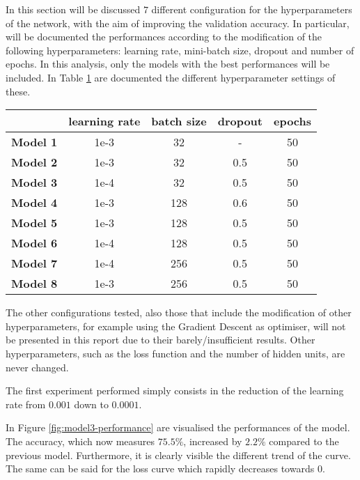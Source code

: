 \documentclass[a4paper,12pt]{article} %
\begin{document}
	In this section will be discussed $7$ different configuration for the 
	hyperparameters of the network, with the aim of improving the validation 
	accuracy. In particular, will be documented the performances according to 
	the modification of the following hyperparameters: learning rate, 
	mini-batch size, dropout and number of epochs. In this analysis, only the 
	models with the best performances will be included. In Table 
	\ref{tab:param1} are documented the different hyperparameter settings of 
	these. 
	
	\begin{table}[htb]
		\centering
		\begin{tabular}{l@{\hspace{.5cm}}cccc}
			\toprule
			& \textbf{learning rate} & \textbf{batch size} & \textbf{dropout} & 
			\textbf{epochs} \\
			\midrule
			\textbf{Model 1}  & {1e-3} & {32}  &  -  & 50\\
			\textbf{Model 2}  & {1e-3} & {32}  & 0.5 & 50\\
			\textbf{Model 3}  & {1e-4} & {32}  & 0.5 & 50 \\
			\textbf{Model 4}  & {1e-3} & {128} & 0.6 & 50 \\
			\textbf{Model 5}  & {1e-3} & {128} & 0.5 & 50 \\
			\textbf{Model 6} & {1e-4} & {128} & 0.5 & 50 \\
			\textbf{Model 7}  & {1e-4} & {256} & 0.5 & 50 \\
			\textbf{Model 8}  & {1e-3} & {256} & 0.5 & 50 \\
			\bottomrule 
		\end{tabular}
		\label{tab:param1}
	\end{table}

	The other configurations tested, also those that include the modification 
	of other hyperparameters, for example using the Gradient Descent as 
	optimiser, will not be presented in this report due to their 
	barely/insufficient results. Other hyperparameters, such as the loss 
	function and the number of hidden units, are never changed. 
	\newline

	The first experiment performed simply consists in the reduction of the 
	learning rate from $0.001$ down to $0.0001$. 
	
	In Figure \ref{fig:model3-performance} are visualised the performances of 
	the model. The accuracy, which now measures $75.5\%$, increased by $2.2\%$ 
	compared to the previous model. Furthermore, it is clearly visible the 
	different trend of the curve. 
	The same can be said for the loss curve which rapidly decreases towards $0$.
	
\end{document}
